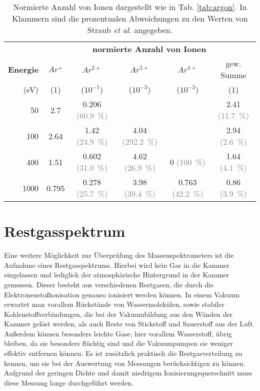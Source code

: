 \begin{table}
    \centering
    \caption[Normierte Anzahl von Ionen und Abweichung zu Werten von Straub \textit{et al.}]{Normierte Anzahl von Ionen dargestellt wie in Tab. \ref{tab:argon}. In Klammern sind die prozentualen Abweichungen zu den Werten von Straub \textit{et al.} \cite{Straub} angegeben.}
    \label{tab:vergleich}
    \begin{tabular}{r c c c c c}
        \toprule
        \text{} & \multicolumn{5}{c}{\textbf{normierte Anzahl von Ionen}} \\ 

        \textbf{Energie} & $Ar^+$ & $Ar^{2+}$ & $Ar^{3+}$ & $Ar^{4+}$ & gew. Summe \\
        (eV) & (1) & ($10^{-1}$) & ($10^{-3}$) & ($10^{-3}$) & ($1$) \\
        \midrule
        50  & {2.7}  & {0.206} \textcolor{gray}{(60.9\ \%)} & {}  & {}  & {2.41} \textcolor{gray}{(11.7\ \%)}   \\
        100 & 2.64  & 1.42 \textcolor{gray}{(24.9\ \%)} & 4.04 \textcolor{gray}{(292.2\ \%)} & {} & 2.94 \textcolor{gray}{(2.6\ \%)} \\
        400 & 1.51  & 0.602 \textcolor{gray}{(31.0\ \%)} & 4.62 \textcolor{gray}{(26.9\ \%)} & 0 \textcolor{gray}{(100\ \%)} & 1.64 \textcolor{gray}{(4.1\ \%)} \\
        1000 & 0.795  & 0.278 \textcolor{gray}{(25.7\ \%)} & 3.98 \textcolor{gray}{(39.4\ \%)} & 0.763 \textcolor{gray}{(42.2\ \%)} & 0.86 \textcolor{gray}{(3.9\ \%)} \\
               
        
        \bottomrule
    \end{tabular}
\end{table}

\section{Restgasspektrum}
Eine weitere Möglichkeit zur Überprüfung des Massenspektrometers ist die Aufnahme eines Restgasspektrums. Hierbei wird kein Gas in die Kammer eingelassen und lediglich der atmosphärische Hintergrund in der Kammer gemessen. Dieser besteht aus verschiedenen Restgasen, die durch die Elektronenstoßionisation genauso ionisiert werden können. In einem Vakuum erwartet man vorallem Rückstände von Wassermolekülen, sowie stabiler Kohlenstoffverbindungen, die bei der Vakuumbildung aus den Wänden der Kammer gelöst werden, als auch Reste von Stickstoff und Sauerstoff aus der Luft. Außerdem können besonders leichte Gase, hier vorallem Wasserstoff, übrig bleiben, da sie besonders flüchtig sind und die Vakuumpumpen sie weniger effektiv entfernen können. Es ist zusätzlich praktisch die Restgasverteilung zu kennen, um sie bei der Auswertung von Messungen berücksichtigen zu können. Aufgrund der geringen Dichte und damit niedrigem Ionisierungsquerschnitt muss diese Messung lange durchgeführt werden. 

